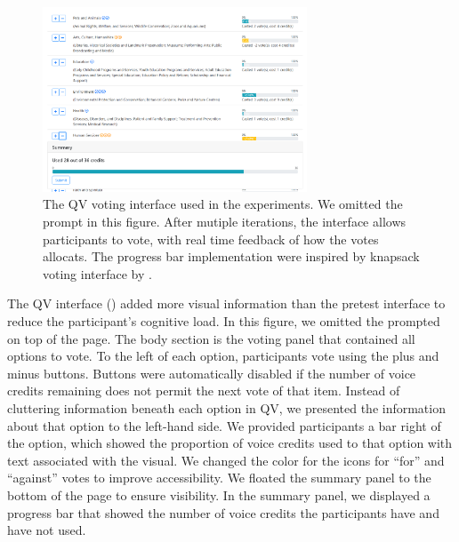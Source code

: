 \begin{figure}[htpb]
    \centering
    \includegraphics[width=0.7\textwidth, keepaspectratio=true]{content/image/qv-donation.png}
    \caption{
        The QV voting interface used in the experiments. 
        We omitted the prompt in this figure.
        After mutiple iterations, 
        the interface allows participants to vote, 
        with real time feedback of how the votes allocats. 
        The progress bar implementation 
        were inspired by knapsack voting interface by \cite{goel2015knapsack}.
    }
    \label{fig:qv_donation}
\end{figure}

The QV interface () added more visual information than the pretest interface to reduce the participant's cognitive load. In this figure, we omitted the prompted on top of the page. The body section is the voting panel that contained all options to vote. To the left of each option, participants vote using the plus and minus buttons. Buttons were automatically disabled if the number of voice credits remaining does not permit the next vote of that item. Instead of cluttering information beneath each option in QV, we presented the information about that option to the left-hand side. We provided participants a bar right of the option, which showed the proportion of voice credits used to that option with text associated with the visual. We changed the color for the icons for ``for'' and ``against'' votes to improve accessibility. We floated the summary panel to the bottom of the page to ensure visibility. In the summary panel, we displayed a progress bar that showed the number of voice credits the participants have and have not used.\par


